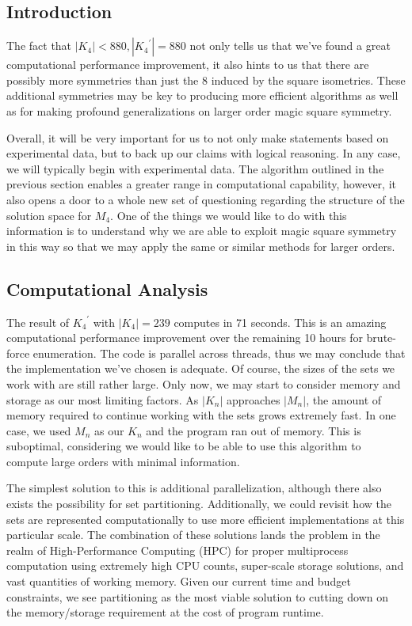 \documentclass{rhumj_new}
\begin{document}
\subsection{Introduction}

The fact that $\left|K_4\right|< 880, \left|{K_4}^\prime\right|=880$ not only tells us that we've
found a great computational performance improvement, it also hints to us that there are possibly
more symmetries than just the 8 induced by the square isometries. These additional symmetries may
be key to producing more efficient algorithms as well as for making profound generalizations on
larger order magic square symmetry.

Overall, it will be very important for us to not only make statements based on experimental data,
but to back up our claims with logical reasoning. In any case, we will typically begin with
experimental data. The algorithm outlined in the previous section enables a greater range in
computational capability, however, it also opens a door to a whole new set of questioning regarding
the structure of the solution space for $M_4$. One of the things we would like to do with this
information is to understand why we are able to exploit magic square symmetry in this way so that
we may apply the same or similar methods for larger orders.

\subsection{Computational Analysis}

The result of ${K_4}^\prime$ with $\left|K_4\right|=239$ computes in 71 seconds. This is an amazing
computational performance improvement over the remaining 10 hours for brute-force enumeration. The
code is parallel across threads, thus we may conclude that the implementation we've chosen is
adequate. Of course, the sizes of the sets we work with are still rather large. Only now, we may
start to consider memory and storage as our most limiting factors. As $\left|K_n\right|$ approaches
$\left|M_n\right|$, the amount of memory required to continue working with the sets grows extremely
fast. In one case, we used $M_n$ as our $K_n$ and the program ran out of memory. This is
suboptimal, considering we would like to be able to use this algorithm to compute large orders with
minimal information.

The simplest solution to this is additional parallelization, although there also exists the
possibility for set partitioning. Additionally, we could revisit how the sets are represented
computationally to use more efficient implementations at this particular scale. The combination of
these solutions lands the problem in the realm of High-Performance Computing (HPC) for proper
multiprocess computation using extremely high CPU counts, super-scale storage solutions, and vast
quantities of working memory. Given our current time and budget constraints, we see partitioning as
the most viable solution to cutting down on the memory/storage requirement at the cost of program
runtime.
\end{document}
